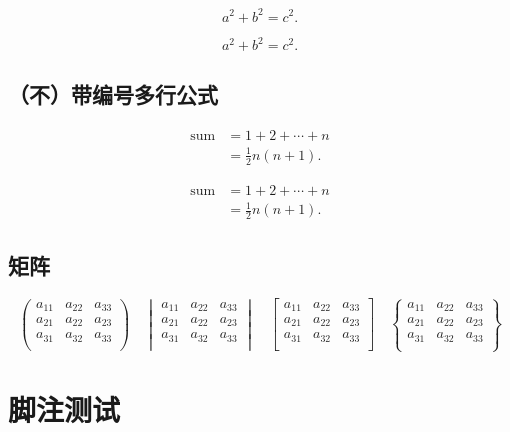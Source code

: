 \documentclass[type = master,class = academic]{whu-thesis}
\begin{document}
\begin{equation}
  a^2 + b^2 = c^2.
\end{equation}

\[ a^2 + b^2 = c^2.\]

\subsection{（不）带编号多行公式}

\begin{align}
  \text{sum} & = 1 + 2 + \cdots + n \\
             & = \frac12 n(n+1).
\end{align}

\begin{align*}
  \text{sum} & = 1 + 2 + \cdots + n \\
             & = \frac12 n(n+1).
\end{align*}

\subsection{矩阵}

\[\begin{pmatrix}
  a_{11} & a_{22} & a_{33} \\
  a_{21} & a_{22} & a_{23} \\
  a_{31} & a_{32} & a_{33} \\
\end{pmatrix} \quad
\begin{vmatrix}
  a_{11} & a_{22} & a_{33} \\
  a_{21} & a_{22} & a_{23} \\
  a_{31} & a_{32} & a_{33} \\
\end{vmatrix} \quad
\begin{bmatrix}
  a_{11} & a_{22} & a_{33} \\
  a_{21} & a_{22} & a_{23} \\
  a_{31} & a_{32} & a_{33} \\
\end{bmatrix} \quad
\begin{Bmatrix}
  a_{11} & a_{22} & a_{33} \\
  a_{21} & a_{22} & a_{23} \\
  a_{31} & a_{32} & a_{33} \\
\end{Bmatrix}\]

\section{脚注测试}
\end{document}
